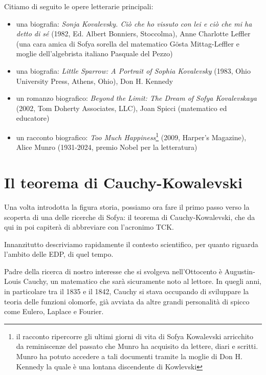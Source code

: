 Citiamo di seguito le opere letterarie principali:
\begin{itemize}

\item una biografia: \textit{Sonja Kovalevsky. Ciò che ho vissuto con lei e ciò che mi ha detto di sé} (1982, Ed. Albert
Bonniers, Stoccolma), Anne Charlotte Leffler (una cara amica di Sofya sorella del matematico Gösta Mittag-Leffler e moglie dell'algebrista italiano Pasquale del Pezzo)

\item una biografia: \textit{Little Sparrow: A Portrait of Sophia Kovalevsky} (1983,
Ohio University Press, Athens, Ohio), Don H. Kennedy

\item un romanzo biografico: \textit{Beyond the Limit: The Dream of Sofya Kovalevskaya} (2002, Tom
Doherty Associates, LLC), Joan Spicci (matematico ed educatore)

\item un racconto biografico: \textit{Too Much Happiness}\footnote{ il racconto ripercorre gli ultimi giorni
di vita di Sofya Kowalevski arricchito da reminiscenze del passato
che Munro ha acquisito da lettere, diari e scritti. Munro ha potuto
accedere a tali documenti tramite la moglie di Don H. Kennedy la quale
è una lontana discendente di Kowlevski} 
(2009, Harper's Magazine), Alice Munro (1931-2024, premio Nobel per la letteratura)

\end{itemize}

\section{Il teorema di Cauchy-Kowalevski}

Una volta introdotta la figura storia, possiamo ora fare il primo passo verso la scoperta di una delle ricerche di Sofya: il teorema di Cauchy-Kowalevski, che da qui in poi capiterà di abbreviare con l'acronimo TCK.

Innanzitutto descriviamo rapidamente il contesto scientifico, per quanto riguarda l'ambito delle EDP, di quel tempo. 

Padre della ricerca di nostro interesse che si svolgeva nell'Ottocento è Augustin-Louis Cauchy, un matematico che sarà sicuramente noto al lettore. In quegli anni, in particolare tra il 1835 e il 1842, Cauchy si stava occupando di sviluppare la teoria delle funzioni olomorfe, già avviata da altre grandi personalità di spicco come Eulero, Laplace e Fourier.


